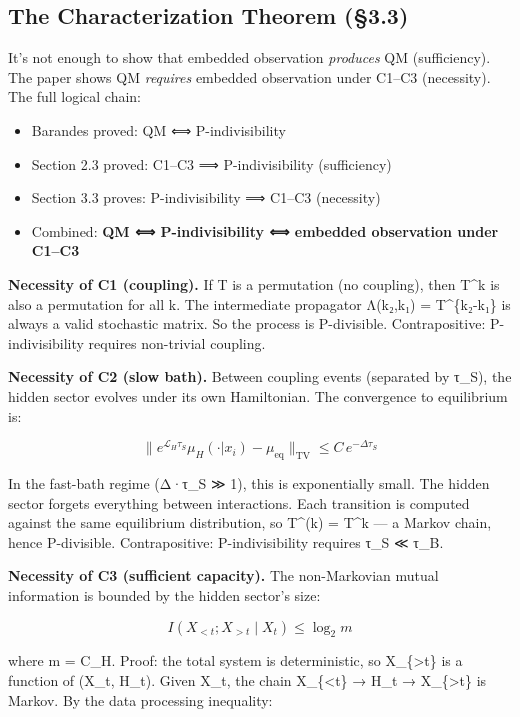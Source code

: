 \documentclass[
]{article}
\providecommand{\tightlist}{%
  \setlength{\itemsep}{0pt}\setlength{\parskip}{0pt}}
\begin{document}
\hypertarget{the-characterization-theorem-3.3}{%
\subsection{The Characterization Theorem
(§3.3)}\label{the-characterization-theorem-3.3}}

It's not enough to show that embedded observation \emph{produces} QM
(sufficiency). The paper shows QM \emph{requires} embedded observation
under C1--C3 (necessity). The full logical chain:

\begin{itemize}
\tightlist
\item
  Barandes proved: QM ⟺ P-indivisibility
\item
  Section 2.3 proved: C1--C3 ⟹ P-indivisibility (sufficiency)
\item
  Section 3.3 proves: P-indivisibility ⟹ C1--C3 (necessity)
\item
  Combined: \textbf{QM ⟺ P-indivisibility ⟺ embedded observation under
  C1--C3}
\end{itemize}

\textbf{Necessity of C1 (coupling).} If T is a permutation (no
coupling), then T\^{}k is also a permutation for all k. The intermediate
propagator Λ(k₂,k₁) = T\^{}\{k₂-k₁\} is always a valid stochastic
matrix. So the process is P-divisible. Contrapositive: P-indivisibility
requires non-trivial coupling.

\textbf{Necessity of C2 (slow bath).} Between coupling events (separated
by τ\_S), the hidden sector evolves under its own Hamiltonian. The
convergence to equilibrium is:

\[\| e^{\mathcal{L}_H \tau_S} \mu_H(\cdot | x_i) - \mu_{\text{eq}} \|_{\text{TV}} \leq C \, e^{-\Delta \tau_S}\]

In the fast-bath regime (Δ·τ\_S ≫ 1), this is exponentially small. The
hidden sector forgets everything between interactions. Each transition
is computed against the same equilibrium distribution, so T\^{}(k) =
T\^{}k --- a Markov chain, hence P-divisible. Contrapositive:
P-indivisibility requires τ\_S ≪ τ\_B.

\textbf{Necessity of C3 (sufficient capacity).} The non-Markovian mutual
information is bounded by the hidden sector's size:

\[I(X_{<t} ; X_{>t} \mid X_t) \leq \log_2 m\]

where m = \textbar C\_H\textbar. Proof: the total system is
deterministic, so X\_\{\textgreater t\} is a function of (X\_t, H\_t).
Given X\_t, the chain X\_\{\textless t\} → H\_t → X\_\{\textgreater t\}
is Markov. By the data processing inequality:
\end{document}
